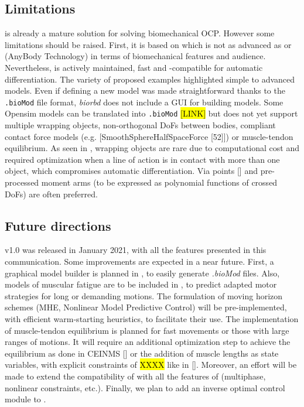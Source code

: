 \subsection{Limitations}

\bioptim is already a mature solution for solving biomechanical OCP. 
However some limitations should be raised. 
First, it is based on  \biorbd which is not as advanced as \opensim or \anybody (AnyBody Technology) in terms of biomechanical features and audience.
Nevertheless,  \biorbd is actively maintained, fast and \casadi-compatible for automatic differentiation.
The variety of proposed examples highlighted simple to advanced models.
Even if defining a new model was made straightforward thanks to the \texttt{.bioMod} file format, \textit{biorbd} does not include a GUI for building models. 
Some Opensim models can be translated into \texttt{.bioMod} \hl{[LINK]} but \biorbd does not yet support multiple wrapping objects, non-orthogonal DoFs between bodies, compliant contact force models (e.g. [SmoothSphereHalfSpaceForce [52]]) or muscle-tendon equilibrium. 
As seen in \addref, wrapping objects are rare due to computational cost and required optimization when a line of action is in contact with more than one object, which compromises automatic differentiation. 
Via points [\addref] and pre-processed moment arms \addref (to be expressed as polynomial functions of crossed DoFs) are often preferred. 

\subsection{Future directions}

\bioptim v1.0 was released in January 2021, with all the features presented in this communication.
Some improvements are expected in a near future.
First, a graphical model builder is planned in \biorbd, to easily generate \textit{.bioMod} files.
Also, models of muscular fatigue are to be included in \bioptim, to predict adapted motor strategies for long or demanding motions.
The formulation of moving horizon schemes (MHE, Nonlinear Model Predictive Control) will be pre-implemented, with efficient warm-starting heuristics, to facilitate their use.
The implementation of muscle-tendon equilibrium is planned for fast movements or those with large ranges of motions. 
It will require an additional optimization step to achieve the equilibrium as done in CEINMS [\addref] or the addition of muscle lengths as state variables, with explicit constraints of \hl{XXXX} like in [\addref].  
Moreover, an effort will be made to extend the compatibility of \acados with all the features of \bioptim (multiphase, nonlinear constraints, etc.). 
Finally, we plan to add an inverse optimal control module to \bioptim.
